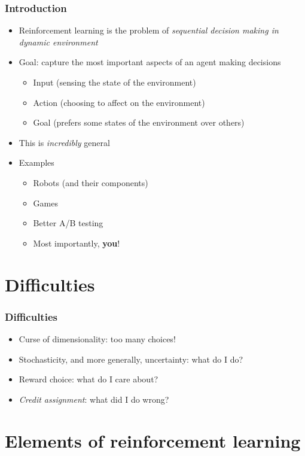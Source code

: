 \documentclass{beamer}
\begin{document}
\begin{frame}
\frametitle{Introduction}
\begin{itemize}
  \item Reinforcement learning is the problem of \textit{sequential decision making in dynamic environment}
  \item Goal: capture the most important aspects of an agent making decisions
    \begin{itemize}
      \item Input (sensing the state of the environment)
      \item Action (choosing to affect on the environment)
      \item Goal (prefers some states of the environment over others)
    \end{itemize}
  \item This is \textit{incredibly} general
  \item Examples
    \begin{itemize}
      \item Robots (and their components)
      \item Games
      \item Better A/B testing
      \item Most importantly, \textbf{you}!
    \end{itemize}
\end{itemize}
\end{frame}

\section{Difficulties}

\begin{frame}
\frametitle{Difficulties}
\begin{itemize}
  \item Curse of dimensionality: too many choices!
  \item Stochasticity, and more generally, uncertainty: what do I do?
  \item Reward choice: what do I care about?
  \item \textit{Credit assignment}: what did I do wrong?
\end{itemize}
\end{frame}

\section{Elements of reinforcement learning}
\end{document}
